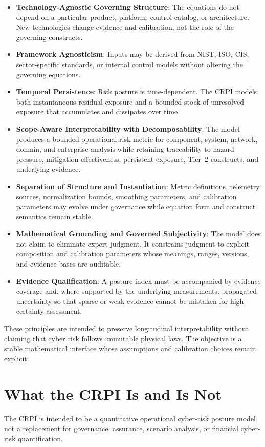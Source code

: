 \documentclass[11pt]{article}
\begin{document}
\begin{itemize}
  \item \textbf{Technology-Agnostic Governing Structure}: The equations do not depend on
    a particular product, platform, control catalog, or architecture. New technologies
    change evidence and calibration, not the role of the governing constructs.
  \item \textbf{Framework Agnosticism}: Inputs may be derived from NIST, ISO, CIS,
    sector-specific standards, or internal control models without altering the governing
    equations.
  \item \textbf{Temporal Persistence}: Risk posture is time-dependent. The CRPI models
    both instantaneous residual exposure and a bounded stock of unresolved exposure
    that accumulates and dissipates over time.
  \item \textbf{Scope-Aware Interpretability with Decomposability}: The model produces a
    bounded operational risk metric for component, system, network, domain, and
    enterprise analysis while retaining traceability to hazard pressure, mitigation
    effectiveness, persistent exposure, Tier~2 constructs, and underlying evidence.
  \item \textbf{Separation of Structure and Instantiation}: Metric definitions,
    telemetry sources, normalization bounds, smoothing parameters, and calibration
    parameters may evolve under governance while equation form and construct semantics
    remain stable.
  \item \textbf{Mathematical Grounding and Governed Subjectivity}: The model does not
    claim to eliminate expert judgment. It constrains judgment to explicit composition
    and calibration parameters whose meanings, ranges, versions, and evidence bases are
    auditable.
  \item \textbf{Evidence Qualification}: A posture index must be accompanied by evidence
    coverage and, where supported by the underlying measurements, propagated uncertainty
    so that sparse or weak evidence cannot be mistaken for high-certainty assessment.
\end{itemize}

These principles are intended to preserve longitudinal interpretability without
claiming that cyber risk follows immutable physical laws. The objective is a stable
mathematical interface whose assumptions and calibration choices remain explicit.

\section{What the CRPI Is and Is Not}
\label{sec:scope}
The CRPI is intended to be a quantitative operational cyber-risk posture model, not a
replacement for governance, assurance, scenario analysis, or financial cyber-risk
quantification.
\end{document}
